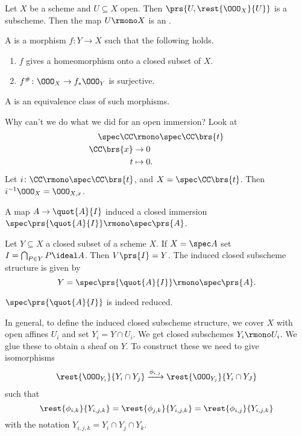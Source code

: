 \documentclass[10pt,a4paper,twoside,openany,hidelinks]{book}
\begin{document}
\begin{definition}
Let $X$ be a scheme and $U \subseteq X$ open. Then $\prs{U, \rest{\OOO_X}{U}}$ is a subscheme. Then the map $U \rmono X$ is an .
\end{definition}

\begin{definition}
A  is a morphism $f \colon Y \to X$ such that the following holds.
\begin{enumerate}
    \item $f$ gives a homeomorphism onto a closed subset of $X$.
    \item $f^{\#} \colon \OOO_X \to f_*\OOO_Y$ is surjective.
\end{enumerate}
\end{definition}

\begin{definition}
A  is an equivalence class of such morphisms.
\end{definition}

\begin{remark}
Why can't we do what we did for an open immersion?
Look at
\begin{align*}
    \spec \CC &\rmono \spec \CC\brs{t} \\
    \CC\brs{x} &\to 0 \\
    t &\mapsto 0 \text{.}
\end{align*}
Let $i \colon \CC \rmono \spec \CC\brs{t}$, and $X = \spec \CC\brs{t}$.
Then
$i^{-1}\OOO_X = \OOO_{X,x}$.
\end{remark}

\begin{remark}
A map $A \to \quot{A}{I}$ induced a closed immersion $\spec \prs{\quot{A}{I}} \rmono \spec \prs{A}$.
\end{remark}

\begin{definition}
Let $Y \subseteq X$ a closed subset of a scheme $X$.
If $X = \spec A$ set $I = \bigcap_{P \in Y} P \ideal A$.
Then $V\prs{I} = Y$. The induced closed subscheme structure is given by
$$Y = \spec\prs{\quot{A}{I}} \rmono \spec \prs{A} \text{.}$$
\end{definition}

\begin{remark}
$\spec\prs{\quot{A}{I}}$ is indeed reduced.
\end{remark}

In general, to define the induced closed subscheme structure, we cover $X$ with open affines $U_i$ and set $Y_i = Y \cap U_i$.
We get closed subschemes $Y_i \rmono U_i$. We glue these to obtain a sheaf on $Y$.
To construct these we need to give isomorphisms
$$\rest{\OOO_{Y_i}}{Y_i \cap Y_j} \xrightarrow{\phi_{i,j}} \rest{\OOO_{Y_j}}{Y_i \cap Y_J}$$
such that
$$\rest{\phi_{i,k}}{Y_{i,j,k}} = \rest{\phi_{j,k}}{Y_{i,j,k}} = \rest{\phi_{i,j}}{Y_{i,j,k}}$$
with the notation $Y_{i,j,k} = Y_i \cap Y_j \cap Y_k$.
\end{document}

